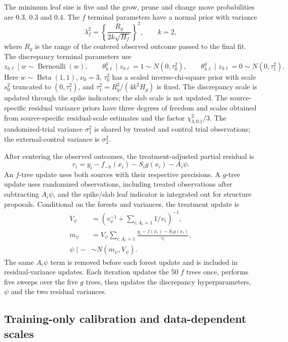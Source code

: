 The minimum leaf size is five and the grow, prune and change move probabilities are 0.3, 0.3 and 0.4. The $f$ terminal parameters have a normal prior with variance
\[
 \lambda_f^2=\left\{\frac{R_y}{2k\sqrt{H_f}}\right\}^2,
 \qquad k=2,
\]
where $R_y$ is the range of the centered observed outcome passed to the final fit. The discrepancy terminal parameters use
\[
 z_{h\ell}\mid w\sim\operatorname{Bernoulli}(w),\qquad
 \theta^g_{h\ell}\mid z_{h\ell}=1\sim N(0,\tau_0^2),\qquad
 \theta^g_{h\ell}\mid z_{h\ell}=0\sim N(0,\tau_1^2).
\]
Here $w\sim\operatorname{Beta}(1,1)$, $\nu_0=3$, $\tau_0^2$ has a scaled inverse-chi-square prior with scale $s_0^2$ truncated to $(0,\tau_1^2)$, and $\tau_1^2=R_y^2/(4k^2H_g)$ is fixed. The discrepancy scale is updated through the spike indicators; the slab scale is not updated. The source-specific residual variance priors have three degrees of freedom and scales obtained from source-specific residual-scale estimates and the factor $\chi^2_{3,0.1}/3$. The randomized-trial variance $\sigma_1^2$ is shared by treated and control trial observations; the external-control variance is $\sigma_2^2$.

After centering the observed outcomes, the treatment-adjusted partial residual is
\[
 r_i=y_i-f_{-h}(x_i)-S_i g(x_i)-A_i\psi.
\]
An $f$-tree update uses both sources with their respective precisions. A $g$-tree update uses randomized observations, including treated observations after subtracting $A_i\psi$, and the spike/slab leaf indicator is integrated out for structure proposals. Conditional on the forests and variances, the treatment update is
\begin{equation}
\begin{aligned}
 V_\psi&=\left(v_\psi^{-1}+\sum_{i:A_i=1}1/v_i\right)^{-1},\\
 m_\psi&=V_\psi\sum_{i:A_i=1}\frac{y_i-f(x_i)-S_i g(x_i)}{v_i},\\
 \psi\mid-&\sim N(m_\psi,V_\psi).
\end{aligned}
\label{eq:joint_app_psi}
\end{equation}
The same $A_i\psi$ term is removed before each forest update and is included in residual-variance updates. Each iteration updates the 50 $f$ trees once, performs five sweeps over the five $g$ trees, then updates the discrepancy hyperparameters, $\psi$ and the two residual variances.

\subsection{Training-only calibration and data-dependent scales}

